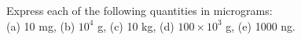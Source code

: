  Express each of the following quantities in micrograms:\\
(a) 10 mg, (b) $10^4$ g, (c) 10 kg, (d) $100\times10^3$ g, (e) 1000 ng. \answercheck\hwendpart
